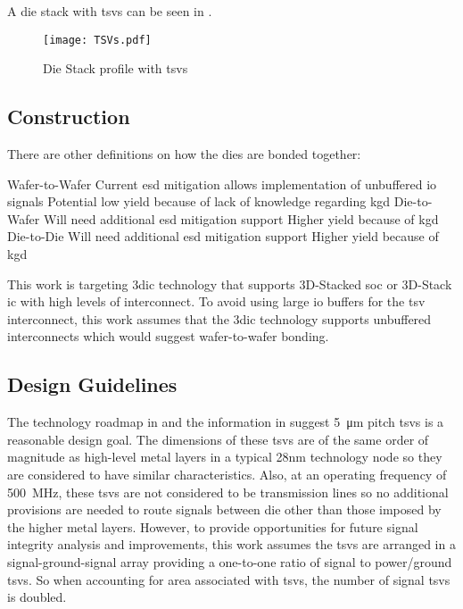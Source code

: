 A die stack with \acp{tsv} can be seen in .

\begin{figure}[h]
\centering
\captionsetup{justification=centering}
\captionsetup{width=.9\linewidth}
\centerline{
\mbox{\texttt{[image: TSVs.pdf]}}
}
\caption{Die Stack profile \cite{itrs2015_interconn} with \acp{tsv}}
\label{fig:tsv}
\end{figure}

\subsection{Construction}
\label{sec:3dic construction}

There are other definitions on how the dies are bonded together:
\begin{outline}
  \1 Wafer-to-Wafer
    \2 Current \ac{esd} mitigation allows implementation of unbuffered \ac{io} signals
    \2 Potential low yield because of lack of knowledge regarding \ac{kgd}
  \1 Die-to-Wafer
    \2 Will need additional \ac{esd} mitigation support
    \2 Higher yield because of \ac{kgd}
  \1 Die-to-Die
    \2 Will need additional \ac{esd} mitigation support
    \2 Higher yield because of \ac{kgd}
\end{outline}

This work is targeting \ac{3dic} technology that supports 3D-Stacked \ac{soc} or 3D-Stack \ac{ic} with high levels of interconnect.
To avoid using large \ac{io} buffers for the \ac{tsv} interconnect, this work assumes that the \ac{3dic} technology supports unbuffered interconnects which would suggest wafer-to-wafer bonding.
\iffalse because of the existing \ac{esd} mitigation during wafer handling although it is anticipated that improved \ac{esd} mitigation will be introduced in future manufacturing steps. \fi

\subsection{Design Guidelines}
\label{sec:3dic Design Guidelines}

The technology roadmap in \cite{itrs2015_interconn} and the information in \cite{patti2014} suggest \SI{5}{\micro\meter} pitch \acp{tsv} is a reasonable design goal. 
The dimensions of these \acp{tsv} are of the same order of magnitude as high-level metal layers in a typical 28nm technology node so they are considered to have similar characteristics.
Also, at an operating frequency of \SI[per-mode=symbol]{500}{\mega \hertz}, these \acp{tsv} are not considered to be transmission lines so no additional provisions are needed to route signals between die other than those imposed by the higher metal layers.
However, to provide opportunities for future signal integrity analysis and improvements, this work assumes the \acp{tsv} are arranged in a signal-ground-signal array providing a one-to-one ratio of signal to power/ground \acp{tsv}.
So when accounting for area associated with \acp{tsv}, the number of signal \acp{tsv} is doubled.

